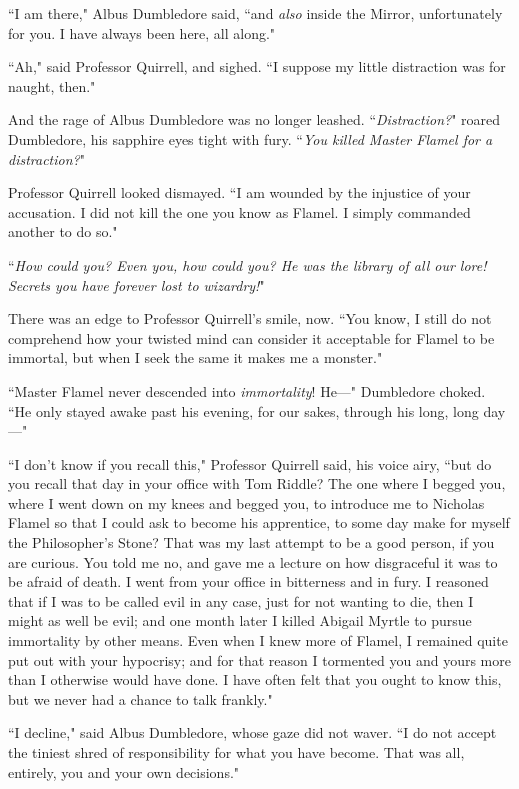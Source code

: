 ``I am there," Albus Dumbledore said, ``and \emph{also} inside the Mirror, unfortunately for you. I have always been here, all along."

``Ah," said Professor Quirrell, and sighed. ``I suppose my little distraction was for naught, then."

And the rage of Albus Dumbledore was no longer leashed. ``\emph{Distraction?}" roared Dumbledore, his sapphire eyes tight with fury. ``\emph{You killed Master Flamel for a distraction?}"

Professor Quirrell looked dismayed. ``I am wounded by the injustice of your accusation. I did not kill the one you know as Flamel. I simply commanded another to do so."

``\emph{How could you? Even you, how could you? He was the library of all our lore! Secrets you have forever lost to wizardry!}"

There was an edge to Professor Quirrell's smile, now. ``You know, I still do not comprehend how your twisted mind can consider it acceptable for Flamel to be immortal, but when I seek the same it makes me a monster."

``Master Flamel never descended into \emph{immortality}! He—" Dumbledore choked. ``He only stayed awake past his evening, for our sakes, through his long, long day—"

``I don't know if you recall this," Professor Quirrell said, his voice airy, ``but do you recall that day in your office with Tom Riddle? The one where I begged you, where I went down on my knees and begged you, to introduce me to Nicholas Flamel so that I could ask to become his apprentice, to some day make for myself the Philosopher's Stone? That was my last attempt to be a good person, if you are curious. You told me no, and gave me a lecture on how disgraceful it was to be afraid of death. I went from your office in bitterness and in fury. I reasoned that if I was to be called evil in any case, just for not wanting to die, then I might as well be evil; and one month later I killed Abigail Myrtle to pursue immortality by other means. Even when I knew more of Flamel, I remained quite put out with your hypocrisy; and for that reason I tormented you and yours more than I otherwise would have done. I have often felt that you ought to know this, but we never had a chance to talk frankly."

``I decline," said Albus Dumbledore, whose gaze did not waver. ``I do not accept the tiniest shred of responsibility for what you have become. That was all, entirely, you and your own decisions."

